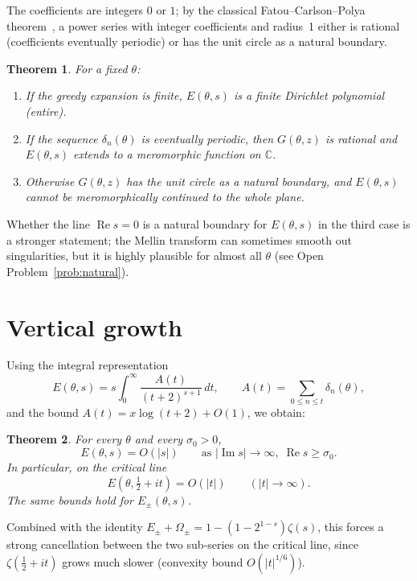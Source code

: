 \documentclass[11pt,a4paper]{article}
\newtheorem{theorem}{Theorem}[section]
\theoremstyle{definition}
\theoremstyle{remark}
\begin{document}
The coefficients are integers \(0\) or \(1\); by the classical Fatou–Carlson–Polya theorem~\cite{FCP}, a power series with integer coefficients and radius~1 either is rational (coefficients eventually periodic) or has the unit circle as a natural boundary.

\begin{theorem}\label{thm:contin}
For a fixed \(\theta\):
\begin{enumerate}[label=(\roman*)]
\item If the greedy expansion is finite, \(E(\theta,s)\) is a finite Dirichlet polynomial (entire).
\item If the sequence \(\delta_n(\theta)\) is eventually periodic, then \(G(\theta,z)\) is rational and \(E(\theta,s)\) extends to a meromorphic function on \(\mathbb{C}\).
\item Otherwise \(G(\theta,z)\) has the unit circle as a natural boundary, and \(E(\theta,s)\) cannot be meromorphically continued to the whole plane.
\end{enumerate}
\end{theorem}

Whether the line \(\operatorname{Re}s=0\) is a natural boundary for \(E(\theta,s)\) in the third case is a stronger statement; the Mellin transform can sometimes smooth out singularities, but it is highly plausible for almost all \(\theta\) (see Open Problem~\ref{prob:natural}).

\section{Vertical growth}
Using the integral representation
\[
E(\theta,s) = s\int_0^\infty \frac{A(t)}{(t+2)^{s+1}}\,dt,
\qquad A(t)=\sum_{0\le n\le t}\delta_n(\theta),
\]
and the bound \(A(t)= x\log(t+2) + O(1)\), we obtain:

\begin{theorem}
For every \(\theta\) and every \(\sigma_0>0\),
\[
E(\theta,s) = O(|s|) \qquad\text{as } |\operatorname{Im}s|\to\infty,\;
\operatorname{Re}s \ge \sigma_0.
\]
In particular, on the critical line
\[
E(\theta,\tfrac12+it) = O(|t|) \qquad (|t|\to\infty).
\]
The same bounds hold for \(E_{\pm}(\theta,s)\).
\end{theorem}

Combined with the identity \(E_{\pm}+\Omega_{\pm}=1-(1-2^{1-s})\zeta(s)\), this forces a strong cancellation between the two sub‑series on the critical line, since \(\zeta(\frac12+it)\) grows much slower (convexity bound \(O(|t|^{1/6})\)).
\end{document}
